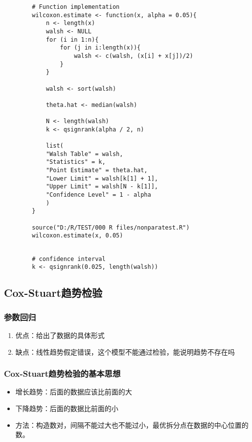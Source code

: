 \documentclass[UTF8]{ctexart}
\numberwithin{equation}{section}
\begin{document}
\begin{center}
    \begin{lstlisting}
        # Function implementation
        wilcoxon.estimate <- function(x, alpha = 0.05){
            n <- length(x)
            walsh <- NULL
            for (i in 1:n){
                for (j in i:length(x)){
                    walsh <- c(walsh, (x[i] + x[j])/2)
                }
            }
        
            walsh <- sort(walsh)
        
            theta.hat <- median(walsh)
        
            N <- length(walsh)
            k <- qsignrank(alpha / 2, n)
        
            list(
            "Walsh Table" = walsh,
            "Statistics" = k,
            "Point Estimate" = theta.hat,
            "Lower Limit" = walsh[k[1] + 1],
            "Upper Limit" = walsh[N - k[1]],
            "Confidence Level" = 1 - alpha
            )
        }

        source("D:/R/TEST/000 R files/nonparatest.R")
        wilcoxon.estimate(x, 0.05)
        
    \end{lstlisting}
\end{center}

\begin{center}
    \begin{lstlisting}
        # confidence interval
        k <- qsignrank(0.025, length(walsh))
    \end{lstlisting}
\end{center}


\subsection{Cox-Stuart趋势检验}

\subsubsection{参数回归}
\begin{enumerate}
    \item 优点：给出了数据的具体形式
    \item 缺点：线性趋势假定错误，这个模型不能通过检验，能说明趋势不存在吗
\end{enumerate}

\subsubsection{Cox-Stuart趋势检验的基本思想}
\begin{itemize}
    \item 增长趋势：后面的数据应该比前面的大
    \item 下降趋势：后面的数据比前面的小
    \item 方法：构造数对，间隔不能过大也不能过小，最优拆分点在数据的中心位置的数。
\end{itemize}
\end{document}

